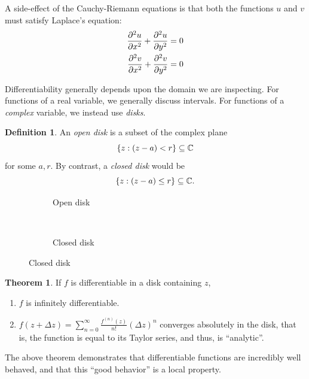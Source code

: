 \documentclass[10pt]{scrartcl}
\numberwithin{equation}{subsection}
\theoremstyle{definition}
\newtheorem{definition}{Definition}[section]
\newtheorem{theorem}{Theorem}[section]
\theoremstyle{remark}
\newenvironment{definitionSR}
	{
		\begin{siderules}
			\begin{definition}
			}
			{
			\end{definition}
		\end{siderules}
	}
\newenvironment{theoremSR}
	{
		\begin{siderules}
			\begin{theorem}
			}
			{
			\end{theorem}
		\end{siderules}
	}
\newcommand{\Complex}{\mathbb{C}}
\begin{document}
A side-effect of the Cauchy-Riemann equations is that both the functions $u$ and $v$
must satisfy Laplace's equation:
\begin{align}
\pdv[2]{u}{x} + \pdv[2]{u}{y} &= 0\\
\pdv[2]{v}{x} + \pdv[2]{v}{y} &= 0
\end{align}

Differentiability generally depends upon the domain we are inspecting.
For functions of a real variable, we generally discuss intervals.
For functions of a \emph{complex} variable, we instead use \textit{disks}.
\begin{definitionSR}
An \textit{open disk} is a subset of the complex plane
\[
\Bqty{z: (z-a)<r} \subseteq \Complex
\]
for some $a,r$. By contrast, a \textit{closed disk} would be
\[
\Bqty{z: (z-a)\leq r} \subseteq \Complex.
\]
\end{definitionSR}
\begin{figure}[h]
\centering
\begin{subfigure}[b]{.4\textwidth}
\caption{Open disk}
\end{subfigure}
~~
\begin{subfigure}[b]{.4\textwidth}
\caption{Closed disk}
\end{subfigure}
\end{figure}

\begin{theoremSR}
If $f$ is differentiable in a disk containing $z$,
\begin{enumerate}
\item $f$ is infinitely differentiable.
\item $f(z+\Delta z) = \sum_{n=0}^\infty \frac{f^{(n)}(z)}{n!} (\Delta z)^n$
converges absolutely in the disk, that is, the function is equal to its Taylor
series, and thus, is ``analytic''.
\end{enumerate}
\end{theoremSR}
The above theorem demonstrates that differentiable functions are incredibly
well behaved, and that this ``good behavior'' is a local property.
\end{document}
